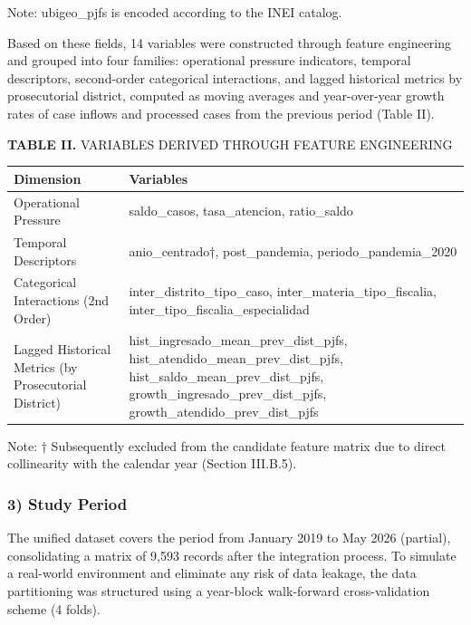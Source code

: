 \documentclass[
  number]{elsarticle}
\newcounter{none} %
\begin{document}
Note: ubigeo\_pjfs is encoded according to the INEI catalog.

Based on these fields, 14 variables were constructed through feature
engineering and grouped into four families: operational pressure
indicators, temporal descriptors, second-order categorical interactions,
and lagged historical metrics by prosecutorial district, computed as
moving averages and year-over-year growth rates of case inflows and
processed cases from the previous period (Table II).

\textbf{TABLE II.} VARIABLES DERIVED THROUGH FEATURE ENGINEERING

{\def\LTcaptype{none} %
\begin{longtable}[]{@{}
  >{\raggedright\arraybackslash}p{}
  >{\raggedright\arraybackslash}p{}@{}}
\toprule\noalign{}
\begin{minipage}[b]{\linewidth}\raggedright
\textbf{Dimension}
\end{minipage} & \begin{minipage}[b]{\linewidth}\raggedright
\textbf{Variables}
\end{minipage} \\
\midrule\noalign{}
\endhead
\bottomrule\noalign{}
\endlastfoot
Operational Pressure & saldo\_casos, tasa\_atencion, ratio\_saldo \\
Temporal Descriptors & anio\_centrado†, post\_pandemia,
periodo\_pandemia\_2020 \\
Categorical Interactions (2nd Order) & inter\_distrito\_tipo\_caso,
inter\_materia\_tipo\_fiscalia, inter\_tipo\_fiscalia\_especialidad \\
Lagged Historical Metrics (by Prosecutorial District) &
hist\_ingresado\_mean\_prev\_dist\_pjfs,
hist\_atendido\_mean\_prev\_dist\_pjfs,
hist\_saldo\_mean\_prev\_dist\_pjfs,
growth\_ingresado\_prev\_dist\_pjfs,
growth\_atendido\_prev\_dist\_pjfs \\
\end{longtable}
}

Note: † Subsequently excluded from the candidate feature matrix due to
direct collinearity with the calendar year (Section III.B.5).

\subsubsection{3) Study Period}\label{study-period}

The unified dataset covers the period from January 2019 to May 2026
(partial), consolidating a matrix of 9,593 records after the integration
process. To simulate a real-world environment and eliminate any risk of
data leakage, the data partitioning was structured using a year-block
walk-forward cross-validation scheme (4 folds).
\end{document}
